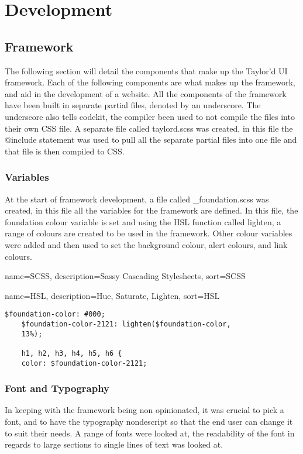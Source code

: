 \chapter*{Development}
\section*{Framework}
The following section will detail the components that make up the Taylor'd UI framework. Each of the following components are what makes up the framework, and aid in the development of a website. All the components of the framework have been built in separate partial files, denoted by an underscore. The underscore also tells codekit, the compiler been used to not compile the files into their own \gls{CSS} file. A separate file called taylord.scss was created, in this file the @include statement was used to pull all the separate partial files into one file and that file is then compiled to \gls{CSS}. 

\subsection*{Variables}
At the start of framework development, a file called \_foundation.scss was created, in this file all the variables for the framework are defined. In this file, the foundation colour variable is set and using the \gls{HSL} function called lighten, a range of colours are created to be used in the framework. Other colour variables were added and then used to set the background colour, alert colours, and link colours.

{
  name={SCSS},
  description={Sassy Cascading Stylesheets},
  sort=SCSS
}

{
  name={HSL},
  description={Hue, Saturate, Lighten},
  sort=HSL
}

\begin{lstlisting}[language=CSS3]
	$foundation-color: #000;
	$foundation-color-2121: lighten($foundation-color, 
	13%);

	h1, h2, h3, h4, h5, h6 {
  	color: $foundation-color-2121;
\end{lstlisting}

\newpage
\subsection*{Font and Typography}
In keeping with the framework being non opinionated, it was crucial to pick a font, and to have the typography nondescript so that the end user can change it to suit their needs. A range of fonts were looked at, the readability of the font in regards to large sections to single lines of text was looked at. 

